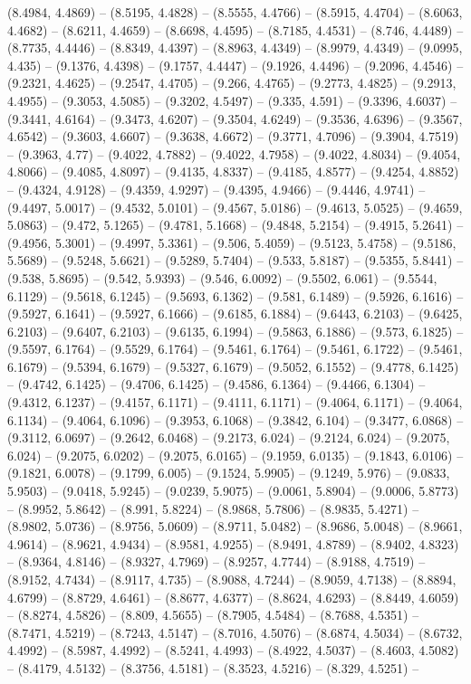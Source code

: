 (8.4984, 4.4869) -- (8.5195, 4.4828) -- (8.5555, 4.4766) -- (8.5915, 4.4704) -- (8.6063, 4.4682) -- (8.6211, 4.4659) -- (8.6698, 4.4595) -- (8.7185, 4.4531) -- (8.746, 4.4489) -- (8.7735, 4.4446) -- (8.8349, 4.4397) -- (8.8963, 4.4349) -- (8.9979, 4.4349) -- (9.0995, 4.435) -- (9.1376, 4.4398) -- (9.1757, 4.4447) -- (9.1926, 4.4496) -- (9.2096, 4.4546) -- (9.2321, 4.4625) -- (9.2547, 4.4705) -- (9.266, 4.4765) -- (9.2773, 4.4825) -- (9.2913, 4.4955) -- (9.3053, 4.5085) -- (9.3202, 4.5497) -- (9.335, 4.591) -- (9.3396, 4.6037) -- (9.3441, 4.6164) -- (9.3473, 4.6207) -- (9.3504, 4.6249) -- (9.3536, 4.6396) -- (9.3567, 4.6542) -- (9.3603, 4.6607) -- (9.3638, 4.6672) -- (9.3771, 4.7096) -- (9.3904, 4.7519) -- (9.3963, 4.77) -- (9.4022, 4.7882) -- (9.4022, 4.7958) -- (9.4022, 4.8034) -- (9.4054, 4.8066) -- (9.4085, 4.8097) -- (9.4135, 4.8337) -- (9.4185, 4.8577) -- (9.4254, 4.8852) -- (9.4324, 4.9128) -- (9.4359, 4.9297) -- (9.4395, 4.9466) -- (9.4446, 4.9741) -- (9.4497, 5.0017) -- (9.4532, 5.0101) -- (9.4567, 5.0186) -- (9.4613, 5.0525) -- (9.4659, 5.0863) -- (9.472, 5.1265) -- (9.4781, 5.1668) -- (9.4848, 5.2154) -- (9.4915, 5.2641) -- (9.4956, 5.3001) -- (9.4997, 5.3361) -- (9.506, 5.4059) -- (9.5123, 5.4758) -- (9.5186, 5.5689) -- (9.5248, 5.6621) -- (9.5289, 5.7404) -- (9.533, 5.8187) -- (9.5355, 5.8441) -- (9.538, 5.8695) -- (9.542, 5.9393) -- (9.546, 6.0092) -- (9.5502, 6.061) -- (9.5544, 6.1129) -- (9.5618, 6.1245) -- (9.5693, 6.1362) -- (9.581, 6.1489) -- (9.5926, 6.1616) -- (9.5927, 6.1641) -- (9.5927, 6.1666) -- (9.6185, 6.1884) -- (9.6443, 6.2103) -- (9.6425, 6.2103) -- (9.6407, 6.2103) -- (9.6135, 6.1994) -- (9.5863, 6.1886) -- (9.573, 6.1825) -- (9.5597, 6.1764) -- (9.5529, 6.1764) -- (9.5461, 6.1764) -- (9.5461, 6.1722) -- (9.5461, 6.1679) -- (9.5394, 6.1679) -- (9.5327, 6.1679) -- (9.5052, 6.1552) -- (9.4778, 6.1425) -- (9.4742, 6.1425) -- (9.4706, 6.1425) -- (9.4586, 6.1364) -- (9.4466, 6.1304) -- (9.4312, 6.1237) -- (9.4157, 6.1171) -- (9.4111, 6.1171) -- (9.4064, 6.1171) -- (9.4064, 6.1134) -- (9.4064, 6.1096) -- (9.3953, 6.1068) -- (9.3842, 6.104) -- (9.3477, 6.0868) -- (9.3112, 6.0697) -- (9.2642, 6.0468) -- (9.2173, 6.024) -- (9.2124, 6.024) -- (9.2075, 6.024) -- (9.2075, 6.0202) -- (9.2075, 6.0165) -- (9.1959, 6.0135) -- (9.1843, 6.0106) -- (9.1821, 6.0078) -- (9.1799, 6.005) -- (9.1524, 5.9905) -- (9.1249, 5.976) -- (9.0833, 5.9503) -- (9.0418, 5.9245) -- (9.0239, 5.9075) -- (9.0061, 5.8904) -- (9.0006, 5.8773) -- (8.9952, 5.8642) -- (8.991, 5.8224) -- (8.9868, 5.7806) -- (8.9835, 5.4271) -- (8.9802, 5.0736) -- (8.9756, 5.0609) -- (8.9711, 5.0482) -- (8.9686, 5.0048) -- (8.9661, 4.9614) -- (8.9621, 4.9434) -- (8.9581, 4.9255) -- (8.9491, 4.8789) -- (8.9402, 4.8323) -- (8.9364, 4.8146) -- (8.9327, 4.7969) -- (8.9257, 4.7744) -- (8.9188, 4.7519) -- (8.9152, 4.7434) -- (8.9117, 4.735) -- (8.9088, 4.7244) -- (8.9059, 4.7138) -- (8.8894, 4.6799) -- (8.8729, 4.6461) -- (8.8677, 4.6377) -- (8.8624, 4.6293) -- (8.8449, 4.6059) -- (8.8274, 4.5826) -- (8.809, 4.5655) -- (8.7905, 4.5484) -- (8.7688, 4.5351) -- (8.7471, 4.5219) -- (8.7243, 4.5147) -- (8.7016, 4.5076) -- (8.6874, 4.5034) -- (8.6732, 4.4992) -- (8.5987, 4.4992) -- (8.5241, 4.4993) -- (8.4922, 4.5037) -- (8.4603, 4.5082) -- (8.4179, 4.5132) -- (8.3756, 4.5181) -- (8.3523, 4.5216) -- (8.329, 4.5251) -- 